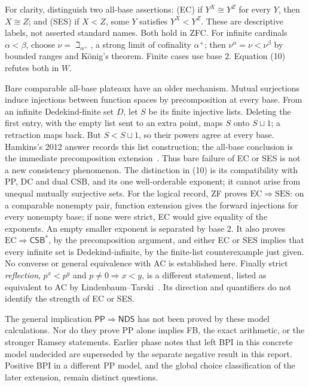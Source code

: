 For clarity, distinguish two all-base assertions: (EC) if
$Y^X\cong Y^Z$ for every $Y$, then $X\cong Z$; and (SES) if $X<Z$,
some $Y$ satisfies $Y^X<Y^Z$. These are descriptive labels, not asserted
standard names. Both hold in ZFC. For infinite cardinals $\alpha<\beta$,
choose $\nu=\beth_{\alpha^+}$, a strong limit of cofinality $\alpha^+$;
then $\nu^\alpha=\nu<\nu^\beta$ by bounded ranges and K\"onig's theorem.
Finite cases use base $2$. Equation (10) refutes both in $W$.

Bare comparable all-base plateaux have an older mechanism. Mutual
surjections induce injections between function spaces by precomposition
at every base. From an infinite Dedekind-finite set $D$, let $S$ be its
finite injective lists. Deleting the first entry, with the empty list
sent to an extra point, maps $S$ onto $S\sqcup1$; a retraction maps back.
But $S<S\sqcup1$, so their powers agree at every base. Hamkins's 2012
answer records this list construction; the all-base conclusion is the
immediate precomposition extension~\cite{Hamkins}. Thus bare failure of
EC or SES is not a new consistency phenomenon. The distinction in (10)
is its compatibility with PP, DC and dual CSB, and its one well-orderable
exponent; it cannot arise from unequal mutually surjective sets.
For the logical record, ZF proves
$\mathrm{EC}\Rightarrow\mathrm{SES}$: on a comparable nonempty pair,
function extension gives the forward injections for every nonempty base;
if none were strict, EC would give equality of the exponents. An empty
smaller exponent is separated by base $2$. It also proves
$\mathrm{EC}\Rightarrow\mathsf{CSB}^*$, by the precomposition argument,
and either EC or SES implies that every infinite set is
Dedekind-infinite, by the finite-list counterexample just given.
No converse or general equivalence with AC is established here.
Finally strict \emph{reflection},
$p^x<p^y$ and $p\ne0\Rightarrow x<y$, is a different statement, listed
as equivalent to AC by Lindenbaum--Tarski~\cite[No.~82(A5)]{LT}.
Its direction and quantifiers do not identify the strength of EC or SES.

The general implication $\mathsf{PP}\Rightarrow\mathsf{NDS}$ has not been
proved by these model calculations. Nor do they prove PP alone implies
FB, the exact arithmetic, or the stronger Ramsey statements. Earlier
phase notes that left BPI in this concrete model undecided are superseded
by the separate negative result in this report. Positive BPI in a different
PP model, and the global choice classification of the later extension,
remain distinct questions.

